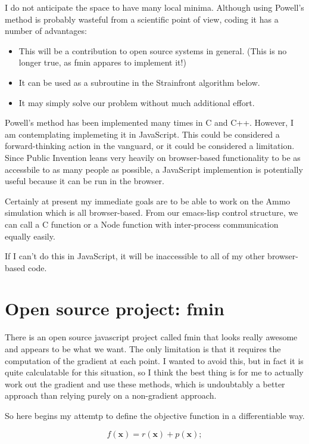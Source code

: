 \documentclass[11pt]{article}
\begin{document}
I do not anticipate the space to have many local minima. Although using Powell's method
is probably wasteful from a scientific point of view, coding it has a number of advantages:
\begin{itemize}
\item This will be a contribution to open source systems in general. (This is no longer true, as fmin appares to implement it!)
\item It can be used as a subroutine in the Strainfront algorithm below.
  \item It may simply solve our problem without much additional effort.
\end{itemize}

Powell's method has been implemented many times in C and C++. However, I am contemplating
implemeting it in JavaScript.  This could be considered a forward-thinking action in the vanguard,
or it could be considered a limitation.  Since Public Invention leans very heavily on browser-based
functionality to be as accessbile to as many people as possible, a JavaScript implemention is
potentially useful because it can be run in the  browser.

Certainly at present my immediate goals are to be able to work on the Ammo simulation which
is all browser-based.  From our emacs-lisp control structure, we can call a C function
or a Node function with inter-process communication equally easily.

If I can't do this in JavaScript, it will be inaccessible to all of my other browser-based
code.

\section{Open source project: fmin}

There is an open source javascript project called fmin that looks really awesome and appears to
be what we want.  The only limitation is that it requires the computation of the gradient at
each point.  I wanted to avoid this, but in fact it is quite calculatable for this situation,
so I think the best thing is for me to actually work out the gradient and use these methods,
which is undoubtably a better approach than relying purely on a non-gradient approach.

So here begins my attemtp to define the objective function in a differentiable way.

\begin{equation}
  f(\mathbf{x}) = r(\mathbf{x}) + p(\mathbf{x});
\end{equation}
\end{document}
